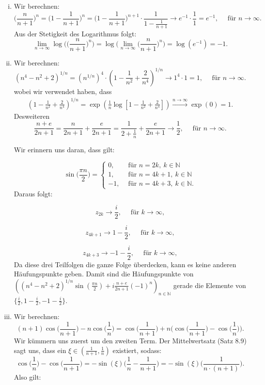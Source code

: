 \documentclass[a4paper, 20]{exam}
\newcommand\NN{\mathbb{N}}
\begin{document}
\begin{solution}
\begin{enumerate}[i.)]
\item
Wir berechnen:
$$\bigg(\frac{n}{n+1} \bigg)^n 
= \bigg(1-\frac{1}{n+1} \bigg)^n
= \bigg(1-\frac{1}{n+1} \bigg)^{n+1} \cdot \frac{1}{1-\frac{1}{n+1}} \longrightarrow e^{-1}\cdot \frac{1}{1}= e^{-1}, \quad \text{ f\"ur } n \longrightarrow \infty.$$
Aus der Stetigkeit des Logarithmus folgt:
$$ \lim_{n \rightarrow \infty} \log \bigg( \Big( \frac{n}{n+1} \Big)^n \bigg)
= \log \bigg( \lim_{n \rightarrow \infty} \bigg(\frac{n}{n+1} \bigg)^n \bigg)
= \log(e^{-1})= -1.$$

\item
Wir berechnen:
$$ (n^4 - n^2 + 2)^{1/n} = (n^{1/n})^4 \cdot \left(1 - \frac{1}{n^2} + \frac{2}{n^4}\right)^{1/n} 
\longrightarrow 1^4 \cdot 1 = 1, \quad \text{ f\"ur } n\longrightarrow \infty.$$
wobei wir verwendet  haben, dass
\begin{align*}
\left( 1- \frac{1}{n^2} + \frac{2}{n^4}\right)^{1/n} = \exp \left( \frac{1}{n}\log\left[ 1- \frac{1}{n^2}+ \frac{2}{n^4}\right] \right) \xrightarrow{n \to \infty}  \exp(0)=1.
\end{align*}
Desweiteren
$$\frac{n + e}{2n + 1} = \frac{n}{2n+1} + \frac{e}{2n+1} = \frac{1}{2+\frac{1}{n}} + \frac{e}{2n+1} \longrightarrow \frac{1}{2}, \quad \text{ f\"ur } n\longrightarrow \infty.$$

Wir erinnern uns daran, dass gilt:

$$\sin\Big(\frac{\pi n}{2}\Big) = \begin{cases} 0, \qquad \text{f\"ur } n=2k,\ k\in \NN \\ 1, \qquad \text{f\"ur } n=4k+1,\ k\in \NN  \\ -1, \quad \  \text{f\"ur } n=4k+3,\ k\in \NN.\end{cases}$$
Daraus folgt:

$$z_{2k} \longrightarrow \frac{i}{2}, \quad \text{ f\"ur } k \longrightarrow \infty,$$

$$z_{4k+1} \longrightarrow 1-\frac{i}{2}, \quad \text{ f\"ur } k \longrightarrow \infty,$$

$$z_{4k+3} \longrightarrow -1-\frac{i}{2}, \quad \text{ f\"ur } k \longrightarrow \infty,$$
Da diese drei Teilfolgen die ganze Folge \"uberdecken, kann es keine anderen H\"aufungspunkte geben. Damit sind  die H\"aufungspunkte von
$((n^4 - n^2 + 2)^{1/n} \sin\left( \frac{\pi n}{2} \right) + i \frac{n + e}{2n + 1}(-1)^n)_{n\in \NN}$ gerade die Elemente von $\{ \frac{i}{2}, 1-\frac{i}{2}, -1-\frac{i}{2}\}$.
\item
Wir berechnen:
$$(n+1)\cos\Big(\frac{1}{n+1}\Big) -n \cos\Big(\frac{1}{n}\Big)
= \cos\Big(\frac{1}{n+1}\Big) + n\bigg( \cos\Big(\frac{1}{n+1}\Big) - \cos\Big(\frac{1}{n}\Big) \bigg).$$
Wir k\"ummern uns zuerst um den zweiten Term. Der Mittelwertsatz (Satz 8.9) sagt uns, dass ein $\xi \in (\frac{1}{n+1}, \frac{1}{n})$ existiert, sodass:
$$ \cos\Big(\frac{1}{n}\Big) - \cos\Big(\frac{1}{n+1}\Big) 
= -\sin(\xi) \bigg( \frac{1}{n} - \frac{1}{n+1} \bigg) 
= -\sin(\xi) \bigg( \frac{1}{n\cdot(n+1)} \bigg).$$
Also gilt:


\end{enumerate}
\end{solution}
\end{document}
